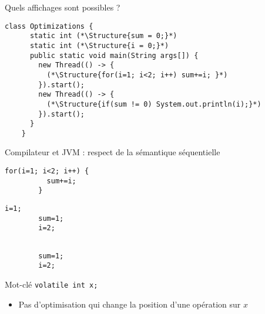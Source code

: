 
\begingroup

\begin{frame}[fragile]{Quels affichages sont possibles ?}

  \begin{lstlisting}[gobble=4]
    class Optimizations {
      static int (*\Structure{sum = 0;}*)
      static int (*\Structure{i = 0;}*)
      public static void main(String args[]) {
        new Thread(() -> {
          (*\Structure{for(i=1; i<2; i++) sum+=i; }*)
        }).start();
        new Thread(() -> {
          (*\Structure{if(sum != 0) System.out.println(i);}*)
        }).start();
      }
    }
  \end{lstlisting}
  
  \pause
  \vspace{-2mm}
  \begin{block}{Compilateur et JVM : respect de la sémantique séquentielle}
    \begin{minipage}{.35\textwidth}
      \begin{lstlisting}[gobble=6]
        for(i=1; i<2; i++) {
          sum+=i;
        }
      \end{lstlisting}
    \end{minipage}
    \pause
    \hspace{\fill}
    \begin{minipage}{.2\textwidth}
      \begin{lstlisting}[gobble=6]
        i=1;
        sum=1;
        i=2;
      \end{lstlisting}
    \end{minipage}
    \hspace{\fill}
    \pause
    \begin{minipage}{.2\textwidth}
      \begin{lstlisting}[gobble=6]
        
        sum=1;
        i=2;
      \end{lstlisting}
    \end{minipage}
  \end{block}

  \pause
  \begin{exampleblock}{Mot-clé \lstinline{volatile int x;}}
    \begin{itemize}
    \item Pas d'optimisation qui change la position d'une opération sur $x$
    \end{itemize}
  \end{exampleblock}

\end{frame}

\endgroup
\endinput
